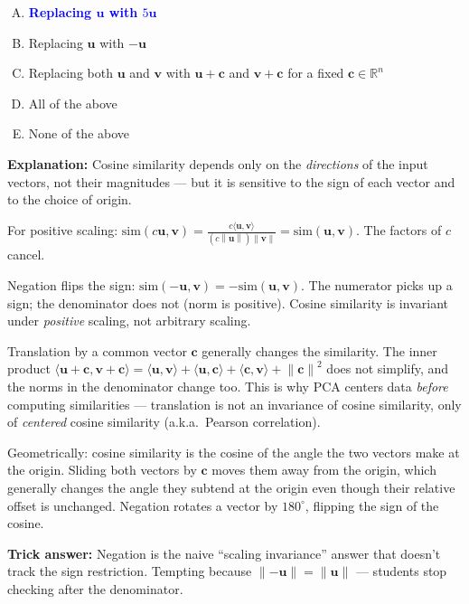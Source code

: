\documentclass[12pt]{amsart}
\newcommand{\norm}[1]{\left\|#1\right\|}
\begin{document}
\begin{enumerate}[(A)]
\item \textcolor{blue}{\textbf{Replacing $\mathbf{u}$ with $5\mathbf{u}$}}
\item Replacing $\mathbf{u}$ with $-\mathbf{u}$
\item Replacing both $\mathbf{u}$ and $\mathbf{v}$ with $\mathbf{u} + \mathbf{c}$ and $\mathbf{v} + \mathbf{c}$ for a fixed $\mathbf{c} \in \mathbb{R}^n$
\item All of the above
\item None of the above
\end{enumerate}

\textbf{Explanation:}
Cosine similarity depends only on the \emph{directions} of the input
vectors, not their magnitudes --- but it is sensitive to the sign of each
vector and to the choice of origin.

For positive scaling: $\mathrm{sim}(c\mathbf{u}, \mathbf{v}) = \frac{c \langle \mathbf{u}, \mathbf{v}\rangle}{(c \norm{\mathbf{u}}) \norm{\mathbf{v}}} = \mathrm{sim}(\mathbf{u}, \mathbf{v})$.
The factors of $c$ cancel.

Negation flips the sign:
$\mathrm{sim}(-\mathbf{u}, \mathbf{v}) = -\mathrm{sim}(\mathbf{u}, \mathbf{v})$.
The numerator picks up a sign; the denominator does not (norm is positive).
Cosine similarity is invariant under \emph{positive} scaling, not arbitrary
scaling.

Translation by a common vector $\mathbf{c}$ generally changes the similarity.
The inner product $\langle \mathbf{u} + \mathbf{c}, \mathbf{v} + \mathbf{c} \rangle = \langle \mathbf{u}, \mathbf{v} \rangle + \langle \mathbf{u}, \mathbf{c} \rangle + \langle \mathbf{c}, \mathbf{v} \rangle + \norm{\mathbf{c}}^2$
does not simplify, and the norms in the denominator change too. This is
why PCA centers data \emph{before} computing similarities --- translation
is not an invariance of cosine similarity, only of \emph{centered} cosine
similarity (a.k.a.\ Pearson correlation).

Geometrically: cosine similarity is the cosine of the angle the two vectors
make at the origin. Sliding both vectors by $\mathbf{c}$ moves them away
from the origin, which generally changes the angle they subtend at the
origin even though their relative offset is unchanged. Negation rotates a
vector by $180^\circ$, flipping the sign of the cosine.

\textbf{Trick answer:}
Negation is the naive ``scaling invariance'' answer that doesn't track the
sign restriction. Tempting because $\norm{-\mathbf{u}} = \norm{\mathbf{u}}$
--- students stop checking after the denominator.
\end{document}
